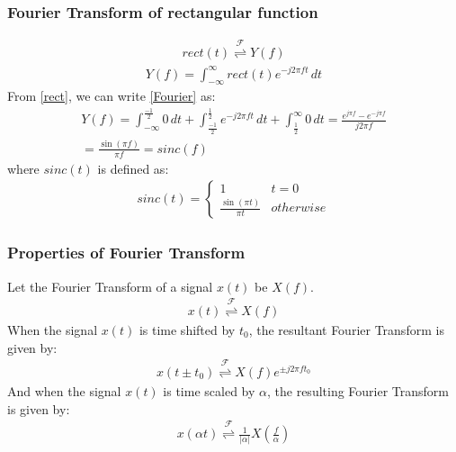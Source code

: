 \documentclass{beamer}
\providecommand{\brak}[1]{\ensuremath{\left(#1\right)}}
\providecommand{\fourier}{\overset{\mathcal{F}}{ \rightleftharpoons}}
\providecommand{\abs}[1]{\left\vert#1\right\vert}
\begin{document}
\begin{frame}
    \frametitle{Fourier Transform of rectangular function}
    \begin{flushleft}
    \begin{align}
    rect(t) \fourier Y(f)
    \end{align}
    \begin{align}
    Y(f) = \int_{-\infty}^\infty rect(t)e^{-j2\pi f t}\,dt
    \label{Fourier}
\end{align}
From \eqref{rect}, we can write \eqref{Fourier} as:
\begin{align}
   Y(f) = \int_{-\infty}^\frac{-1}{2} 0\,dt + \int_{\frac{-1}{2}}^\frac{1}{2} e^{-j2\pi ft}\,dt + \int_\frac{1}{2}^\infty 0\,dt
    = \frac{e^{j\pi f} - e^{-j \pi f}}{j2\pi f}\\
      = \frac{\sin (\pi f)}{\pi f}
       = sinc( f)
\end{align}
where $sinc(t)$ is defined as:
\begin{align}
    sinc(t) = 
    \begin{cases}
    1 & t = 0\\
    \frac{\sin(\pi t)}{\pi t} & otherwise
    \end{cases}
\end{align}
    \end{flushleft}
\end{frame}
\begin{frame}
    \frametitle{Properties of Fourier Transform}
    \begin{flushleft}
    Let the Fourier Transform of a signal $x(t)$ be $X(f)$.
\begin{align}
    x(t) \fourier X(f)
\end{align}
When the signal $x(t)$ is time shifted by $t_0$, the resultant Fourier Transform is given by:
\begin{align}
    x(t \pm t_0) \fourier X(f)e^{\pm j2\pi ft_0}
    \label{shift}
\end{align}
And when the signal $x(t)$ is time scaled by $\alpha$, the resulting Fourier Transform is given by:
\begin{align}
    x(\alpha t) \fourier \frac{1}{\abs{\alpha}}X\brak{\frac{f}{\alpha}}
    \label{scale}
\end{align}
    \end{flushleft}
\end{frame}
\end{document}

